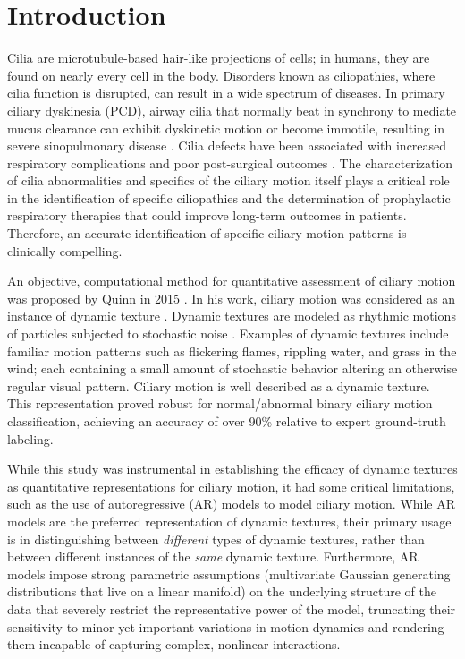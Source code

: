 \section{Introduction}

Cilia are microtubule-based hair-like projections of cells; in humans, they are found on nearly every cell in the body. Disorders known as ciliopathies, where cilia function is disrupted, can result in a wide spectrum of diseases. In primary ciliary dyskinesia (PCD), airway cilia that normally beat in synchrony to mediate mucus clearance can exhibit dyskinetic motion or become immotile, resulting in severe sinopulmonary disease \cite{o2007diagnosing}. Cilia defects have been associated with increased respiratory complications and poor post-surgical outcomes \cite{nakhleh2012high}. The characterization of cilia abnormalities and specifics of the ciliary motion itself plays a critical role in the identification of specific ciliopathies and the determination of prophylactic respiratory therapies that could improve long-term outcomes in patients. Therefore, an accurate identification of specific ciliary motion patterns is clinically compelling.

An objective, computational method for quantitative assessment of ciliary motion was proposed by Quinn in 2015 \cite{quinn2015automated}. In his work, ciliary motion was considered as an instance of dynamic texture \cite{saisan2001dynamic}. Dynamic textures are modeled as rhythmic motions of particles subjected to stochastic noise \cite{chen2013automatic}. Examples of dynamic textures include familiar motion patterns such as flickering flames, rippling water, and grass in the wind; each containing a small amount of stochastic behavior altering an otherwise regular visual pattern. Ciliary motion is well described as a dynamic texture. This representation proved robust for normal/abnormal binary ciliary motion classification, achieving an accuracy of over 90\% relative to expert ground-truth labeling.

While this study was instrumental in establishing the efficacy of dynamic textures as quantitative representations for ciliary motion, it had some critical limitations, such as the use of autoregressive (AR) models \cite{hyndman2007higher} to model ciliary motion. While AR models are the preferred representation of dynamic textures, their primary usage is in distinguishing between \textit{different} types of dynamic textures, rather than between different instances of the \textit{same} dynamic texture. Furthermore, AR models impose strong parametric assumptions (multivariate Gaussian generating distributions that live on a linear manifold) on the underlying structure of the data  that severely restrict the representative power of the model, truncating their sensitivity to minor yet important variations in motion dynamics and rendering them incapable of capturing complex, nonlinear interactions.

